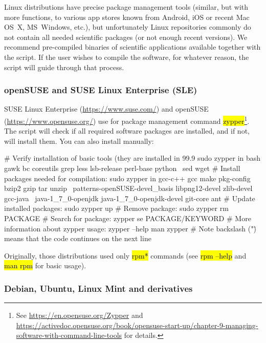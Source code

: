 \documentclass[a4paper, 11pt, twoside]{article}
\renewcommand{\texttt}[1]{\hl{\ttfamily #1}}
\begin{document}
Linux distributions have precise package management tools (similar, but with more functions, to various app stores known from Android, iOS or recent Mac OS~X, MS~Windows, etc.), but unfortunately Linux repositories commonly do not contain all needed scientific packages (or not enough recent versions). We recommend pre-compiled binaries of scientific applications available together with the script. If the user wishes to compile the software, for whatever reason, the script will guide through that process.

\subsubsection{openSUSE and SUSE Linux Enterprise (SLE)}

SUSE Linux Enterprise (\url{https://www.suse.com/}) and openSUSE (\url{https://www.opensuse.org/}) use for package management command \texttt{zypper}\footnote{See \url{https://en.opensuse.org/Zypper} and \url{https://activedoc.opensuse.org/book/opensuse-start-up/chapter-9-managing-software-with-command-line-tools} for details.}. The script will check if all required software packages are installed, and if not, will install them. You can also install manually:

\begin{bashcode}
  # Verify installation of basic tools (they are installed in 99.9%
  sudo zypper in bash gawk bc coreutils grep less lsb-release perl-base python \
    sed wget
  # Install packages needed for compilation:
  sudo zypper in gcc-c++ gcc make pkg-config bzip2 gzip tar unzip \
    patterns-openSUSE-devel_basis libpng12-devel zlib-devel gcc-java \
    java-1_7_0-openjdk java-1_7_0-openjdk-devel git-core ant
  # Update installed packages:
  sudo zypper up
  # Remove package:
  sudo zypper rm PACKAGE
  # Search for package:
  zypper se PACKAGE/KEYWORD
  # More information about zypper usage:
  zypper --help
  man zypper
  # Note backslash ("\") means that the code continues on the next line
\end{bashcode}

Originally, those distributions used only \texttt{rpm*} commands (see \texttt{rpm --help} and \texttt{man rpm} for basic usage).

\subsubsection{Debian, Ubuntu, Linux Mint and derivatives}
\end{document}

